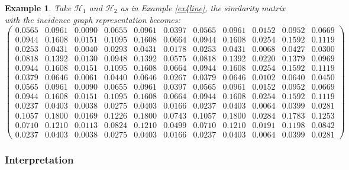 \documentclass[a4paper,11pt]{report}
\newtheorem{example}[theorem]{Example}
\newcommand{\hgrafeen}{\mathcal{H}}
\begin{document}
\begin{example}\label{igex4}
Take $\hgrafeen_1$ and $\hgrafeen_2$ as in Example \ref{ex4line}, the similarity 
matrix with the incidence graph representation becomes:
$$\left(\begin{array}{llllllll|lll}
0.0565&0.0961&0.0090&0.0655&0.0961&0.0397&0.0565&0.0961&0.0152&0.0952&0.0669\\
0.0944&0.1608&0.0151&0.1095&0.1608&0.0664&0.0944&0.1608&0.0254&0.1592&0.1119\\
0.0253&0.0431&0.0040&0.0293&0.0431&0.0178&0.0253&0.0431&0.0068&0.0427&0.0300\\
0.0818&0.1392&0.0130&0.0948&0.1392&0.0575&0.0818&0.1392&0.0220&0.1379&0.0969\\
0.0944&0.1608&0.0151&0.1095&0.1608&0.0664&0.0944&0.1608&0.0254&0.1592&0.1119\\
0.0379&0.0646&0.0061&0.0440&0.0646&0.0267&0.0379&0.0646&0.0102&0.0640&0.0450\\
0.0565&0.0961&0.0090&0.0655&0.0961&0.0397&0.0565&0.0961&0.0152&0.0952&0.0669\\
0.0944&0.1608&0.0151&0.1095&0.1608&0.0664&0.0944&0.1608&0.0254&0.1592&0.1119\\
\hline
0.0237&0.0403&0.0038&0.0275&0.0403&0.0166&0.0237&0.0403&0.0064&0.0399&0.0281\\
0.1057&0.1800&0.0169&0.1226&0.1800&0.0743&0.1057&0.1800&0.0284&0.1783&0.1253\\
0.0710&0.1210&0.0113&0.0824&0.1210&0.0499&0.0710&0.1210&0.0191&0.1198&0.0842\\
0.0237&0.0403&0.0038&0.0275&0.0403&0.0166&0.0237&0.0403&0.0064&0.0399&0.0281
\end{array}\right)$$

\end{example}
\subsubsection{Interpretation}
\end{document}
